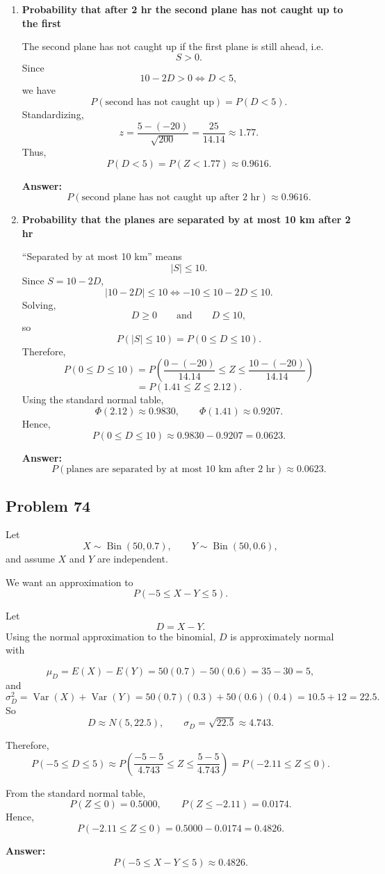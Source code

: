 \begin{enumerate}
    \item[(a)] \textbf{Probability that after 2 hr the second plane has not caught up to the first}

    The second plane has not caught up if the first plane is still ahead, i.e.
    \[
    S>0.
    \]
    Since
    \[
    10-2D>0 \iff D<5,
    \]
    we have
    \[
    P(\text{second has not caught up})=P(D<5).
    \]
    Standardizing,
    \[
    z=\frac{5-(-20)}{\sqrt{200}}=\frac{25}{14.14}\approx 1.77.
    \]
    Thus,
    \[
    P(D<5)=P(Z<1.77)\approx 0.9616.
    \]

    \textbf{Answer:}
    \[
    P(\text{second plane has not caught up after 2 hr})\approx 0.9616.
    \]

    \item[(b)] \textbf{Probability that the planes are separated by at most 10 km after 2 hr}

    “Separated by at most 10 km” means
    \[
    |S|\le 10.
    \]
    Since $S=10-2D$,
    \[
    |10-2D|\le 10
    \iff -10\le 10-2D\le 10.
    \]
    Solving,
    \[
    D\ge 0 \qquad \text{and} \qquad D\le 10,
    \]
    so
    \[
    P(|S|\le 10)=P(0\le D\le 10).
    \]
    Therefore,
    \[
    P(0\le D\le 10)
    =P\!\left(\frac{0-(-20)}{14.14}\le Z\le \frac{10-(-20)}{14.14}\right)
    \]
    \[
    =P(1.41\le Z\le 2.12).
    \]
    Using the standard normal table,
    \[
    \Phi(2.12)\approx 0.9830,\qquad \Phi(1.41)\approx 0.9207.
    \]
    Hence,
    \[
    P(0\le D\le 10)\approx 0.9830-0.9207=0.0623.
    \]

    \textbf{Answer:}
    \[
    P(\text{planes are separated by at most 10 km after 2 hr})\approx 0.0623.
    \]
\end{enumerate}

\subsection*{Problem 74}

Let
\[
X\sim \operatorname{Bin}(50,0.7), \qquad Y\sim \operatorname{Bin}(50,0.6),
\]
and assume $X$ and $Y$ are independent.

We want an approximation to
\[
P(-5\le X-Y\le 5).
\]

Let
\[
D=X-Y.
\]
Using the normal approximation to the binomial, $D$ is approximately normal with

\[
\mu_D=E(X)-E(Y)=50(0.7)-50(0.6)=35-30=5,
\]
and
\[
\sigma_D^2=\operatorname{Var}(X)+\operatorname{Var}(Y)
=50(0.7)(0.3)+50(0.6)(0.4)
=10.5+12=22.5.
\]
So
\[
D \approx N(5,22.5),
\qquad
\sigma_D=\sqrt{22.5}\approx 4.743.
\]

Therefore,
\[
P(-5\le D\le 5)
\approx
P\left(\frac{-5-5}{4.743}\le Z\le \frac{5-5}{4.743}\right)
=
P(-2.11\le Z\le 0).
\]

From the standard normal table,
\[
P(Z\le 0)=0.5000,\qquad P(Z\le -2.11)=0.0174.
\]
Hence,
\[
P(-2.11\le Z\le 0)=0.5000-0.0174=0.4826.
\]

\textbf{Answer:}
\[
P(-5\le X-Y\le 5)\approx 0.4826.
\]
